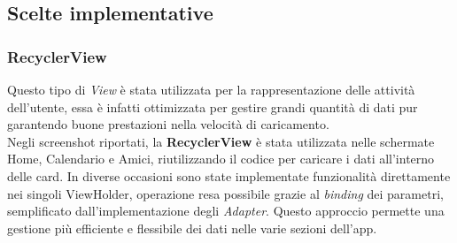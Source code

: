 \documentclass{article}
\begin{document}
    \newpage
    \subsection*{Scelte implementative}
    \subsubsection*{RecyclerView}
    Questo tipo di \textit{View} è stata utilizzata per la rappresentazione delle attività dell'utente, essa è infatti ottimizzata per gestire grandi quantità di dati pur garantendo buone prestazioni nella velocità di caricamento. \vspace*{7pt}\\
    Negli screenshot riportati, la \textbf{RecyclerView} è stata utilizzata nelle schermate Home, Calendario e Amici, riutilizzando il codice per caricare i dati all'interno delle card. In diverse occasioni sono state implementate funzionalità direttamente nei singoli ViewHolder, operazione resa possibile grazie al \textit{binding} dei parametri, semplificato dall'implementazione degli \textit{Adapter}. Questo approccio permette una gestione più efficiente e flessibile dei dati nelle varie sezioni dell'app.
\end{document}
